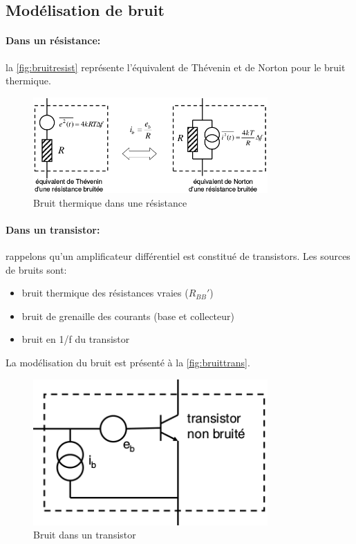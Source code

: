 \subsection{Modélisation de bruit}
\paragraph{Dans un résistance:} la \autoref{fig:bruitresist} représente l'équivalent de Thévenin et de Norton pour le bruit thermique.
\begin{figure}[H] 
	\centering 
	\includegraphics[width=0.8\textwidth,height=10\baselineskip,keepaspectratio]{ch3/image1} 
	\caption{Bruit thermique dans une résistance}
	\label{fig:bruitresist}
\end{figure}
\paragraph{Dans un transistor:} rappelons qu'un amplificateur différentiel est constitué de transistors. Les sources de bruits sont:
\begin{itemize}
	\item bruit thermique des résistances vraies (\(R_{BB}'\))
	\item bruit de grenaille des courants (base et collecteur)
	\item bruit en 1/f du transistor
\end{itemize}
La modélisation du bruit est présenté à la \autoref{fig:bruittrans}.
\begin{figure}[H] 
	\centering 
	\includegraphics[width=0.8\textwidth,height=10\baselineskip,keepaspectratio]{ch3/image2} 
	\caption{Bruit dans un transistor}
	\label{fig:bruittrans}
\end{figure}
